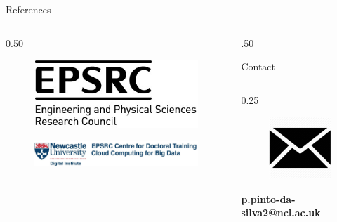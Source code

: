 \documentclass[final]{beamer}
\newlength{\colwidth}
\begin{document}
\begin{frame}[t]
\begin{columns}[t]
\begin{column}{\colwidth}
\begin{block}{References}
  \end{block}

  \begin{columns}[c] %

    \begin{column}{0.50\colwidth}

      \begin{figure}
        \includegraphics[width=0.40\linewidth]{sponsor-bwhighres.jpg}
        \label{fig:epsrc_logo}
      \end{figure}

      \begin{figure}
        \includegraphics[width=0.90\linewidth]{CDT_CCBD2.jpg}
        \label{fig:cdt_logo}
      \end{figure}

    \end{column}%

    \begin{column}{.50\colwidth}

      \begin{alertblock}{Contact}

        \begin{columns}[t] %
          \begin{column}{0.25\colwidth}

            \begin{figure}
              \centering
              \includegraphics[width=0.2\linewidth]{mail.png}
              \label{fig:mail}
            \end{figure}

            \centering\textbf{p.pinto-da-silva2@ncl.ac.uk}

          \end{column}%


\end{columns}
\end{alertblock}
\end{column}
\end{columns}
\end{column}
\end{columns}
\end{frame}
\end{document}
